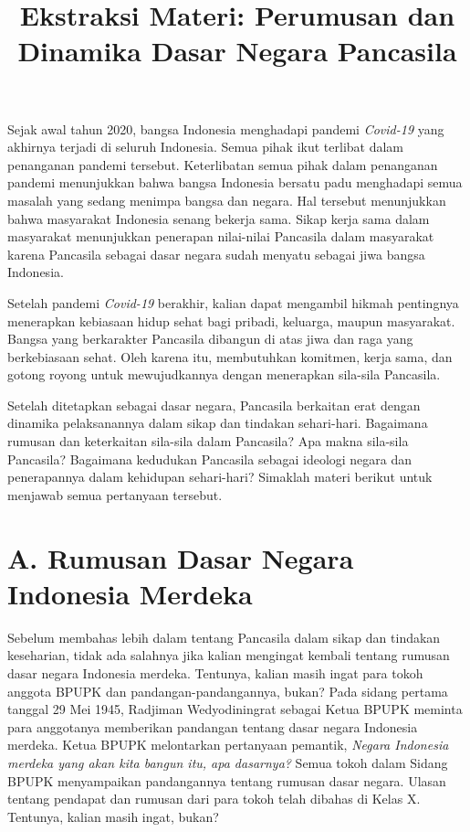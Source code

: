 \documentclass[12pt,a4paper]{article}
\title{\textbf{Ekstraksi Materi: Perumusan dan Dinamika Dasar Negara Pancasila}}
\author{}
\date{}
\begin{document}
\maketitle

Sejak awal tahun 2020, bangsa Indonesia menghadapi pandemi \textit{Covid-19} yang akhirnya terjadi di seluruh Indonesia. Semua pihak ikut terlibat dalam penanganan pandemi tersebut. Keterlibatan semua pihak dalam penanganan pandemi menunjukkan bahwa bangsa Indonesia bersatu padu menghadapi semua masalah yang sedang menimpa bangsa dan negara. Hal tersebut menunjukkan bahwa masyarakat Indonesia senang bekerja sama. Sikap kerja sama dalam masyarakat menunjukkan penerapan nilai-nilai Pancasila dalam masyarakat karena Pancasila sebagai dasar negara sudah menyatu sebagai jiwa bangsa Indonesia.

Setelah pandemi \textit{Covid-19} berakhir, kalian dapat mengambil hikmah pentingnya menerapkan kebiasaan hidup sehat bagi pribadi, keluarga, maupun masyarakat. Bangsa yang berkarakter Pancasila dibangun di atas jiwa dan raga yang berkebiasaan sehat. Oleh karena itu, membutuhkan komitmen, kerja sama, dan gotong royong untuk mewujudkannya dengan menerapkan sila-sila Pancasila.

Setelah ditetapkan sebagai dasar negara, Pancasila berkaitan erat dengan dinamika pelaksanannya dalam sikap dan tindakan sehari-hari. Bagaimana rumusan dan keterkaitan sila-sila dalam Pancasila? Apa makna sila-sila Pancasila? Bagaimana kedudukan Pancasila sebagai ideologi negara dan penerapannya dalam kehidupan sehari-hari? Simaklah materi berikut untuk menjawab semua pertanyaan tersebut.

\section*{A. Rumusan Dasar Negara Indonesia Merdeka}
Sebelum membahas lebih dalam tentang Pancasila dalam sikap dan tindakan keseharian, tidak ada salahnya jika kalian mengingat kembali tentang rumusan dasar negara Indonesia merdeka. Tentunya, kalian masih ingat para tokoh anggota BPUPK dan pandangan-pandangannya, bukan? Pada sidang pertama tanggal 29 Mei 1945, Radjiman Wedyodiningrat sebagai Ketua BPUPK meminta para anggotanya memberikan pandangan tentang dasar negara Indonesia merdeka. Ketua BPUPK melontarkan pertanyaan pemantik, \textit{Negara Indonesia merdeka yang akan kita bangun itu, apa dasarnya?} Semua tokoh dalam Sidang BPUPK menyampaikan pandangannya tentang rumusan dasar negara. Ulasan tentang pendapat dan rumusan dari para tokoh telah dibahas di Kelas X. Tentunya, kalian masih ingat, bukan?
\end{document}
